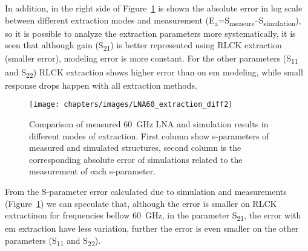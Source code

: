 In addition, in the right side of Figure~\ref{fig_lna_extraction_diff} is shown the absolute error in log scale between different extraction modes and measurement (E\textsubscript{a}=\textbar S\textsubscript{measure}--S\textsubscript{simulation}\textbar), so it is possible to analyze the extraction parameters more systematically, it is seen that although gain (S\textsubscript{21}) is better represented using RLCK extraction (smaller error), \momentum modeling error is more constant. For the other parameters (S\textsubscript{11} and S\textsubscript{22}) RLCK extraction shows higher error than on \gls{em} modeling, while small response drops happen with all extraction methods.
\begin{figure}%
\centering
\texttt{[image: chapters/images/LNA60\_extraction\_diff2]}
\caption[Comparison of measured \SI{60}{\giga\hertz} LNA and simulation results in different modes of extraction.]{Comparison of measured \SI{60}{\giga\hertz} LNA and simulation results in different modes of extraction. First column show s-parameters of measured and simulated structures, second column is the corresponding absolute error of simulations related to the measurement of each s-parameter.}
\label{fig_lna_extraction_diff}
\end{figure}

From the S-parameter error calculated due to simulation and measurements (Figure~\ref{fig_lna_extraction_diff}) we can speculate that, although the error is smaller on RLCK extractinon for frequencies bellow \SI{60}{\giga\hertz}, in the parameter S\textsubscript{21}, the error with \gls{em} extraction have less variation, further the error is even smaller on the other parameters (S\textsubscript{11} and S\textsubscript{22}).

